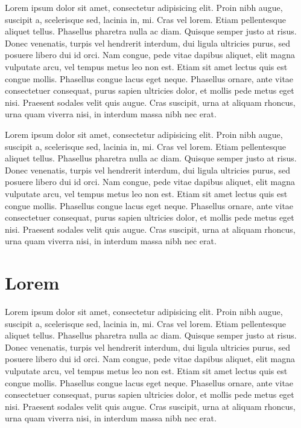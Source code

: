 \documentclass{mini}
\begin{document}
Lorem ipsum dolor sit amet, consectetur adipisicing elit. Proin nibh augue, suscipit a, scelerisque sed, lacinia in, mi. Cras vel lorem. Etiam pellentesque aliquet tellus. Phasellus pharetra nulla ac diam. Quisque semper justo at risus. Donec venenatis, turpis vel hendrerit interdum, dui ligula ultricies purus, sed posuere libero dui id orci. Nam congue, pede vitae dapibus aliquet, elit magna vulputate arcu, vel tempus metus leo non est. Etiam sit amet lectus quis est congue mollis. Phasellus congue lacus eget neque. Phasellus ornare, ante vitae consectetuer consequat, purus sapien ultricies dolor, et mollis pede metus eget nisi. Praesent sodales velit quis augue. Cras suscipit, urna at aliquam rhoncus, urna quam viverra nisi, in interdum massa nibh nec erat.

Lorem ipsum dolor sit amet, consectetur adipisicing elit. Proin nibh augue, suscipit a, scelerisque sed, lacinia in, mi. Cras vel lorem. Etiam pellentesque aliquet tellus. Phasellus pharetra nulla ac diam. Quisque semper justo at risus. Donec venenatis, turpis vel hendrerit interdum, dui ligula ultricies purus, sed posuere libero dui id orci. Nam congue, pede vitae dapibus aliquet, elit magna vulputate arcu, vel tempus metus leo non est. Etiam sit amet lectus quis est congue mollis. Phasellus congue lacus eget neque. Phasellus ornare, ante vitae consectetuer consequat, purus sapien ultricies dolor, et mollis pede metus eget nisi. Praesent sodales velit quis augue. Cras suscipit, urna at aliquam rhoncus, urna quam viverra nisi, in interdum massa nibh nec erat.

\chapter{Lorem}

Lorem ipsum dolor sit amet, consectetur adipisicing elit. Proin nibh augue, suscipit a, scelerisque sed, lacinia in, mi. Cras vel lorem. Etiam pellentesque aliquet tellus. Phasellus pharetra nulla ac diam. Quisque semper justo at risus. Donec venenatis, turpis vel hendrerit interdum, dui ligula ultricies purus, sed posuere libero dui id orci. Nam congue, pede vitae dapibus aliquet, elit magna vulputate arcu, vel tempus metus leo non est. Etiam sit amet lectus quis est congue mollis. Phasellus congue lacus eget neque. Phasellus ornare, ante vitae consectetuer consequat, purus sapien ultricies dolor, et mollis pede metus eget nisi. Praesent sodales velit quis augue. Cras suscipit, urna at aliquam rhoncus, urna quam viverra nisi, in interdum massa nibh nec erat.
\end{document}
